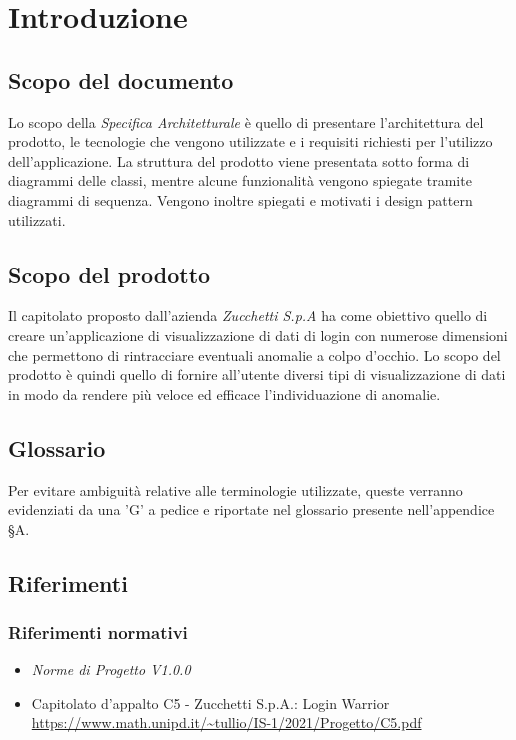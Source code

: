 \chapter{Introduzione}

\section{Scopo del documento}
Lo scopo della \textit{Specifica Architetturale} è quello di presentare l’architettura del prodotto, le tecnologie che vengono utilizzate e i requisiti richiesti per l'utilizzo dell'applicazione.  La struttura del prodotto viene presentata sotto forma di diagrammi delle classi, mentre alcune funzionalità vengono spiegate tramite diagrammi di sequenza. Vengono inoltre spiegati e motivati i design pattern utilizzati.

\section{Scopo del prodotto}
Il capitolato proposto dall'azienda \textit{Zucchetti S.p.A} ha come obiettivo quello di creare un'applicazione di visualizzazione di dati di login con numerose dimensioni che permettono
di rintracciare eventuali anomalie a colpo d'occhio. Lo scopo del prodotto è quindi quello di fornire all'utente diversi tipi di visualizzazione di dati in modo da rendere
più veloce ed efficace l'individuazione di anomalie.

\section{Glossario}
Per evitare ambiguità relative alle terminologie utilizzate, queste verranno evidenziati da una 'G' a pedice e riportate nel glossario presente nell'appendice §A.

\section{Riferimenti}
\subsection{Riferimenti normativi}
\begin{itemize}
    \item \textit{Norme di Progetto V1.0.0}
    \item Capitolato d'appalto C5 - Zucchetti S.p.A.: Login Warrior \\
    \url{https://www.math.unipd.it/~tullio/IS-1/2021/Progetto/C5.pdf}
\end{itemize}

